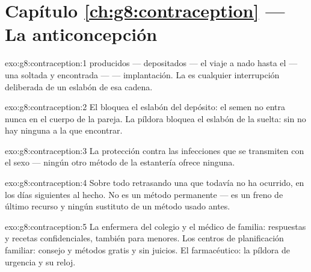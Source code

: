 \section*{Capítulo \ref{ch:g8:contraception} --- La anticoncepción}

\begin{solution}{exo:g8:contraception:1}
 producidos ---  depositados --- el viaje a nado
hasta el  --- una   soltada y encontrada ---
 --- implantación. La  es cualquier
interrupción deliberada de un eslabón de esa cadena.
\end{solution}

\begin{solution}{exo:g8:contraception:2}
El  bloquea el eslabón del depósito: el semen no entra
nunca en el cuerpo de la pareja. La píldora bloquea el eslabón de la
suelta: sin  no hay ninguna   a la que encontrar.
\end{solution}

\begin{solution}{exo:g8:contraception:3}
La protección contra las infecciones que se transmiten con el sexo ---
ningún otro método de la estantería ofrece ninguna.
\end{solution}

\begin{solution}{exo:g8:contraception:4}
Sobre todo retrasando una  que todavía no ha ocurrido, en los
días siguientes al hecho. No es un método permanente --- es un freno de
último recurso y ningún sustituto de un método usado antes.
\end{solution}

\begin{solution}{exo:g8:contraception:5}
La enfermera del colegio y el médico de familia: respuestas y recetas
confidenciales, también para menores. Los centros de planificación
familiar: consejo y métodos gratis y sin juicios. El farmacéutico: la
píldora de urgencia y su reloj.
\end{solution}

